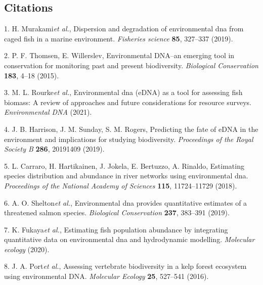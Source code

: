 \documentclass[
]{article}
\begin{document}
\clearpage

\hypertarget{citations}{%
\subsection*{Citations}\label{citations}}

\hypertarget{refs}{}
\leavevmode\hypertarget{ref-murakami2019dispersion}{}%
1. H. Murakami\emph{et al.}, Dispersion and degradation of environmental
dna from caged fish in a marine environment. \emph{Fisheries science}
\textbf{85}, 327--337 (2019).

\leavevmode\hypertarget{ref-thomsen2015environmental}{}%
2. P. F. Thomsen, E. Willerslev, Environmental DNA--an emerging tool in
conservation for monitoring past and present biodiversity.
\emph{Biological Conservation} \textbf{183}, 4--18 (2015).

\leavevmode\hypertarget{ref-rourke2021environmental}{}%
3. M. L. Rourke\emph{et al.}, Environmental dna (eDNA) as a tool for
assessing fish biomass: A review of approaches and future considerations
for resource surveys. \emph{Environmental DNA} (2021).

\leavevmode\hypertarget{ref-harrison2019predicting}{}%
4. J. B. Harrison, J. M. Sunday, S. M. Rogers, Predicting the fate of
eDNA in the environment and implications for studying biodiversity.
\emph{Proceedings of the Royal Society B} \textbf{286}, 20191409 (2019).

\leavevmode\hypertarget{ref-carraro2018estimating}{}%
5. L. Carraro, H. Hartikainen, J. Jokela, E. Bertuzzo, A. Rinaldo,
Estimating species distribution and abundance in river networks using
environmental dna. \emph{Proceedings of the National Academy of
Sciences} \textbf{115}, 11724--11729 (2018).

\leavevmode\hypertarget{ref-shelton2019biocons}{}%
6. A. O. Shelton\emph{et al.}, Environmental dna provides quantitative
estimates of a threatened salmon species. \emph{Biological Conservation}
\textbf{237}, 383--391 (2019).

\leavevmode\hypertarget{ref-Fukaya2020estimating}{}%
7. K. Fukaya\emph{et al.}, Estimating fish population abundance by
integrating quantitative data on environmental dna and hydrodynamic
modelling. \emph{Molecular ecology} (2020).

\leavevmode\hypertarget{ref-port2016assessing}{}%
8. J. A. Port\emph{et al.}, Assessing vertebrate biodiversity in a kelp
forest ecosystem using environmental DNA. \emph{Molecular Ecology}
\textbf{25}, 527--541 (2016).
\end{document}
